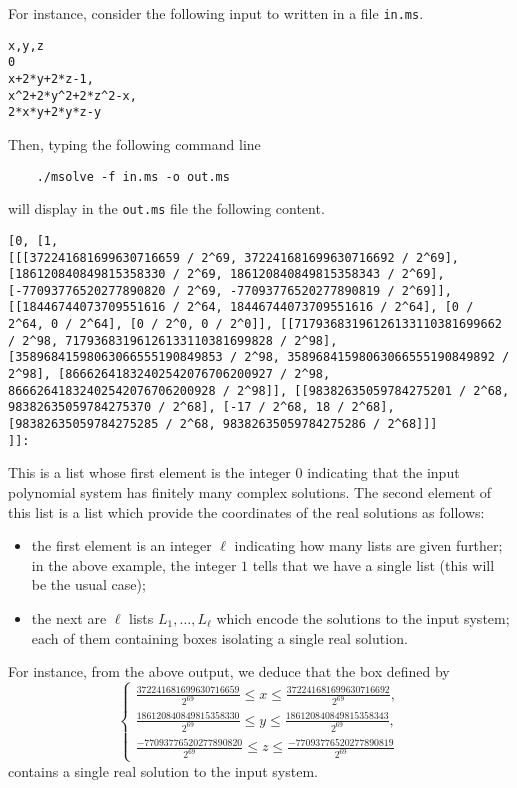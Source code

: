 \documentclass[a4paper,english,11pt]{scrartcl}
\theoremstyle{definition}
\theoremstyle{remark}
\def\leq{\leqslant}
\begin{document}
For instance, consider the following input to \msolve written in a file
\verb+in.ms+.
\begin{tcolorbox}
\begin{verbatim}
x,y,z
0
x+2*y+2*z-1,
x^2+2*y^2+2*z^2-x,
2*x*y+2*y*z-y
\end{verbatim}  
\end{tcolorbox}
Then, typing the following command line
\begin{tcolorbox}
  \begin{verbatim}
    ./msolve -f in.ms -o out.ms 
  \end{verbatim}
\end{tcolorbox}
will display in the \verb+out.ms+ file the following content. 
\begin{tcolorbox}
{\tiny\begin{lstlisting}[breaklines]
[0, [1,
[[[372241681699630716659 / 2^69, 372241681699630716692 / 2^69], [186120840849815358330 / 2^69, 186120840849815358343 / 2^69], [-77093776520277890820 / 2^69, -77093776520277890819 / 2^69]], [[18446744073709551616 / 2^64, 18446744073709551616 / 2^64], [0 / 2^64, 0 / 2^64], [0 / 2^0, 0 / 2^0]], [[71793683196126133110381699662 / 2^98, 71793683196126133110381699828 / 2^98], [35896841598063066555190849853 / 2^98, 35896841598063066555190849892 / 2^98], [86662641832402542076706200927 / 2^98, 86662641832402542076706200928 / 2^98]], [[98382635059784275201 / 2^68, 98382635059784275370 / 2^68], [-17 / 2^68, 18 / 2^68], [98382635059784275285 / 2^68, 98382635059784275286 / 2^68]]]
]]:
\end{lstlisting}}
\end{tcolorbox}
This is a list whose first element is the integer $0$ indicating that the input
polynomial system has finitely many complex solutions. The second element of
this list is a list which provide the coordinates of the real solutions as
follows:
\begin{itemize}
\item the first element is an integer $\ell$ indicating how many lists are given
  further; in the above example, the integer $1$ tells that we have a single
  list (this will be the usual case);
\item the next are $\ell$ lists $L_1, \ldots, L_\ell$ which encode the solutions
  to the input system; each of them containing boxes isolating a single real
  solution. 
\end{itemize}
For instance, from the above output, we deduce that the box defined by 
\[
  \left \{
  \begin{array}{l}
  \frac{372241681699630716659}{2^{69}}\leq x \leq
  \frac{372241681699630716692}{2^{69}}, \\
  \frac{186120840849815358330}{2^{69}}\leq
  y \leq \frac{186120840849815358343}{2^{69}}, \\
  \frac{-77093776520277890820}{2^{69}}
  \leq z \leq \frac{-77093776520277890819}{2^{69}}
\end{array}\right .
\]
contains a single real solution to the input system.
\end{document}
